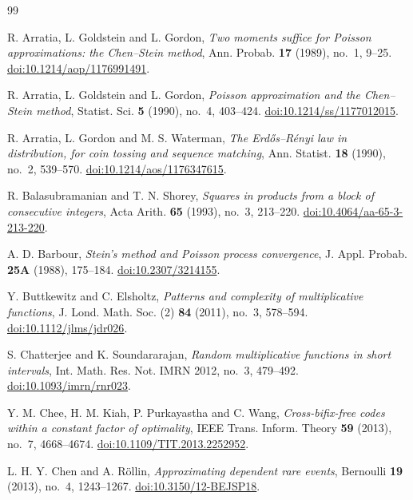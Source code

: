 \begin{thebibliography}{99}

R. Arratia, L. Goldstein and L. Gordon,
\emph{Two moments suffice for Poisson approximations: the Chen--Stein method},
Ann. Probab. \textbf{17} (1989), no.~1, 9--25.
\href{https://doi.org/10.1214/aop/1176991491}{doi:10.1214/aop/1176991491}.

R. Arratia, L. Goldstein and L. Gordon,
\emph{Poisson approximation and the Chen--Stein method},
Statist. Sci. \textbf{5} (1990), no.~4, 403--424.
\href{https://doi.org/10.1214/ss/1177012015}{doi:10.1214/ss/1177012015}.

R. Arratia, L. Gordon and M. S. Waterman,
\emph{The Erdős--Rényi law in distribution, for coin tossing and sequence matching},
Ann. Statist. \textbf{18} (1990), no.~2, 539--570.
\href{https://doi.org/10.1214/aos/1176347615}{doi:10.1214/aos/1176347615}.

R. Balasubramanian and T. N. Shorey,
\emph{Squares in products from a block of consecutive integers},
Acta Arith. \textbf{65} (1993), no.~3, 213--220.
\href{https://doi.org/10.4064/aa-65-3-213-220}{doi:10.4064/aa-65-3-213-220}.

A. D. Barbour,
\emph{Stein's method and Poisson process convergence},
J. Appl. Probab. \textbf{25A} (1988), 175--184.
\href{https://doi.org/10.2307/3214155}{doi:10.2307/3214155}.

Y. Buttkewitz and C. Elsholtz,
\emph{Patterns and complexity of multiplicative functions},
J. Lond. Math. Soc. (2) \textbf{84} (2011), no.~3, 578--594.
\href{https://doi.org/10.1112/jlms/jdr026}{doi:10.1112/jlms/jdr026}.

S. Chatterjee and K. Soundararajan,
\emph{Random multiplicative functions in short intervals},
Int. Math. Res. Not. IMRN 2012, no.~3, 479--492.
\href{https://doi.org/10.1093/imrn/rnr023}{doi:10.1093/imrn/rnr023}.

Y. M. Chee, H. M. Kiah, P. Purkayastha and C. Wang,
\emph{Cross-bifix-free codes within a constant factor of optimality},
IEEE Trans. Inform. Theory \textbf{59} (2013), no.~7, 4668--4674.
\href{https://doi.org/10.1109/TIT.2013.2252952}{doi:10.1109/TIT.2013.2252952}.

L. H. Y. Chen and A. Röllin,
\emph{Approximating dependent rare events},
Bernoulli \textbf{19} (2013), no.~4, 1243--1267.
\href{https://doi.org/10.3150/12-BEJSP18}{doi:10.3150/12-BEJSP18}.


\end{thebibliography}
